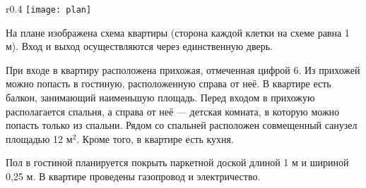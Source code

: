 \documentclass[12pt, a4paper]{article}
\begin{document}
	  
	\begin{wrapfigure}{r}{0.4\textwidth}
		\texttt{[image: plan]}
	\end{wrapfigure}
	На плане изображена схема квартиры (сторона каждой клетки на схеме равна 1 м). Вход и выход осуществляются через единственную дверь.
	
	При входе в квартиру расположена прихожая, отмеченная цифрой 6. Из прихожей можно попасть в гостиную, расположенную справа от неё. В квартире есть балкон, занимающий наименьшую площадь. Перед входом в прихожую располагается спальня, а справа от неё — детская комната, в которую можно попасть только из спальни. Рядом со спальней расположен совмещенный санузел площадью 12 м$^2$. Кроме того, в квартире есть кухня.
	
	Пол в гостиной планируется покрыть паркетной доской длиной 1 м и шириной 0,25 м. В квартире проведены газопровод и электричество.
	
\end{document}
